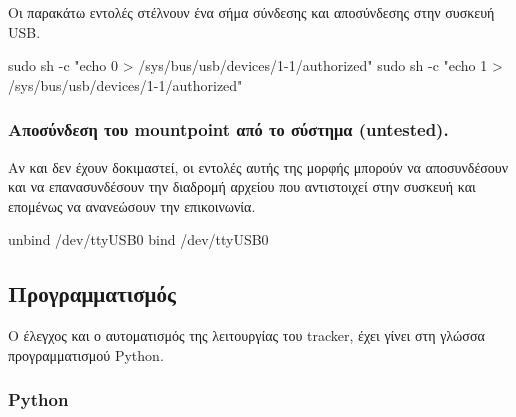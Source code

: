 \documentclass[
  a4paper,
  twoside,
  titlepage,
  11pt]{article}
\newenvironment{Shaded}{\begin{snugshade}}{\end{snugshade}}
\newcommand{\AttributeTok}[1]{\textcolor[rgb]{0.77,0.63,0.00}{#1}}
\newcommand{\BuiltInTok}[1]{#1}
\newcommand{\ExtensionTok}[1]{#1}
\newcommand{\FunctionTok}[1]{\textcolor[rgb]{0.00,0.00,0.00}{#1}}
\newcommand{\NormalTok}[1]{#1}
\newcommand{\StringTok}[1]{\textcolor[rgb]{0.31,0.60,0.02}{#1}}
\numberwithin{equation}{section}
\numberwithin{figure}{section}
\numberwithin{table}{section}
\begin{document}
Οι παρακάτω εντολές στέλνουν ένα σήμα σύνδεσης και αποσύνδεσης στην συσκευή USB.

\begin{Shaded}
\begin{Highlighting}[]
\FunctionTok{sudo}\NormalTok{ sh }\AttributeTok{{-}c} \StringTok{"echo 0 \textgreater{} /sys/bus/usb/devices/1{-}1/authorized"}
\FunctionTok{sudo}\NormalTok{ sh }\AttributeTok{{-}c} \StringTok{"echo 1 \textgreater{} /sys/bus/usb/devices/1{-}1/authorized"}
\end{Highlighting}
\end{Shaded}

\hypertarget{ux3b1ux3c0ux3bfux3c3ux3cdux3bdux3b4ux3b5ux3c3ux3b7-ux3c4ux3bfux3c5-mountpoint-ux3b1ux3c0ux3cc-ux3c4ux3bf-ux3c3ux3cdux3c3ux3c4ux3b7ux3bcux3b1-untested.}{%
\subsubsection{Αποσύνδεση του mountpoint από το σύστημα (untested).}\label{ux3b1ux3c0ux3bfux3c3ux3cdux3bdux3b4ux3b5ux3c3ux3b7-ux3c4ux3bfux3c5-mountpoint-ux3b1ux3c0ux3cc-ux3c4ux3bf-ux3c3ux3cdux3c3ux3c4ux3b7ux3bcux3b1-untested.}}

Αν και δεν έχουν δοκιμαστεί, οι εντολές αυτής της μορφής μπορούν να αποσυνδέσουν και να επανασυνδέσουν την διαδρομή αρχείου που αντιστοιχεί στην συσκευή και επομένως να ανανεώσουν την επικοινωνία.

\begin{Shaded}
\begin{Highlighting}[]
\ExtensionTok{unbind}\NormalTok{ /dev/ttyUSB0}
\BuiltInTok{bind}\NormalTok{   /dev/ttyUSB0}
\end{Highlighting}
\end{Shaded}

\hypertarget{ux3c0ux3c1ux3bfux3b3ux3c1ux3b1ux3bcux3bcux3b1ux3c4ux3b9ux3c3ux3bcux3ccux3c2}{%
\subsection{Προγραμματισμός}\label{ux3c0ux3c1ux3bfux3b3ux3c1ux3b1ux3bcux3bcux3b1ux3c4ux3b9ux3c3ux3bcux3ccux3c2}}

Ο έλεγχος και ο αυτοματισμός της λειτουργίας του tracker, έχει γίνει στη γλώσσα προγραμματισμού Python.

\hypertarget{python}{%
\subsubsection{Python}\label{python}}
\end{document}
